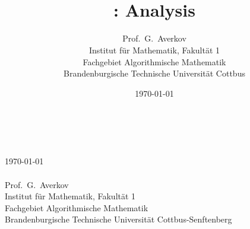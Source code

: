 

\author{Prof.~G.~Averkov\\{\small Institut für Mathematik, Fakultät 1}\\{\small Fachgebiet Algorithmische Mathematik}\\{\small Brandenburgische Technische Universität Cottbus}}
\title{\Huge{}\\ \Large{: Analysis}}
\date{\today}

\mainmatter
\thispagestyle{empty}
\begin{center}
	\Huge{}\\ \Large{}
	\\ \normalsize{\today}
	\\ {\ }
	\\ \large{Prof.~G.~Averkov} 
	\\{\small Institut für Mathematik, Fakultät 1}\\{\small Fachgebiet Algorithmische Mathematik}\\{\small Brandenburgische Technische Universität Cottbus-Senftenberg}
\end{center} 

\tableofcontents





